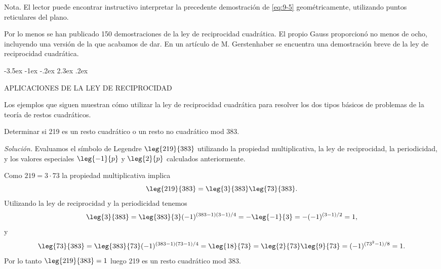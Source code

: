 \documentclass[12pt,a4paper]{book}
\makeatletter
\renewcommand\section{\@startsection{section}{1}{\z@}%
  {-3.5ex \@plus -1ex \@minus -.2ex}%
  {2.3ex \@plus .2ex}%
  {\normalfont\Large\bfseries\raggedright}}
\makeatother
\begin{document}
    Nota. El lector puede encontrar instructivo interpretar la precedente demostración de
    \eqref{eq:9-5} geométricamente, utilizando puntos reticulares del plano.

    Por lo menos se han publicado 150 demostraciones de la ley de reciprocidad cuadrática.
    El propio Gauss proporcionó no menos de ocho, incluyendo una versión de la que acabamos
    de dar. En un artículo de M. Gerstenhaber \cite{gerstenhaber1963} se encuentra una demostración breve de
    la ley de reciprocidad cuadrática.

    \section{APLICACIONES DE LA LEY DE RECIPROCIDAD}

    Los ejemplos que siguen muestran cómo utilizar la ley de reciprocidad cuadrática para
    resolver los dos tipos básicos de problemas de la teoría de restos cuadráticos.

    \begin{ejemplo}
        Determinar si 219 es un resto cuadrático o un resto no cuadrático mod 383.

        \textit{Solución.} Evaluamos el símbolo de Legendre $\leg{219}{383}$ utilizando la
        propiedad multiplicativa, la ley de reciprocidad, la periodicidad, y los valores
        especiales $\leg{-1}{p}$ y $\leg{2}{p}$ calculados anteriormente.

        Como $219=3\cdot73$ la propiedad multiplicativa implica
        \begin{equation*}
            \leg{219}{383}=\leg{3}{383}\leg{73}{383}.
        \end{equation*}
        Utilizando la ley de reciprocidad y la periodicidad tenemos
        \begin{equation*}
            \leg{3}{383}=\leg{383}{3}(-1)^{(383-1)(3-1)/4}=-\leg{-1}{3}=-(-1)^{(3-1)/2}=1,
        \end{equation*}
        y
        \begin{equation*}
            \leg{73}{383}=\leg{383}{73}(-1)^{(383-1)(73-1)/4}=\leg{18}{73}=\leg{2}{73}\leg{9}{73}=(-1)^{(73^{2}-1)/8}=1.
        \end{equation*}
        Por lo tanto $\leg{219}{383}=1$ luego 219 es un resto cuadrático mod 383.
    \end{ejemplo}
\end{document}
